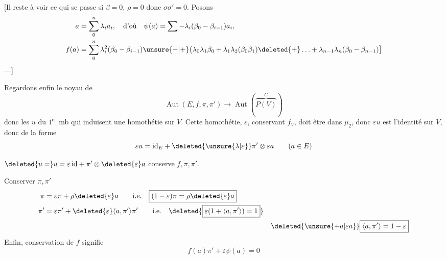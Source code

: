 
[Il reste à voir ce qui se passe si $\beta=0$, $\rho=0$ donc $\sigma\sigma'=0$. Posons
\[
\begin{aligned}
a&=\sum_0^n\lambda_i a_i,\quad\text{d'où}\quad \psi(a)=\sum-\lambda_i(\beta_0-\beta_{i-1})a_i,\\
f(a)&=\sum_0^n\lambda_i^2(\beta_0-\beta_{i-1})\unsure{-|+}\bigl(\lambda_0\lambda_1\beta_0+\lambda_1\lambda_2(\beta_0\beta_1)\deleted{+}\ldots+\lambda_{n-1}\lambda_n(\beta_0-\beta_{n-1})\bigr]
\end{aligned}
\]
\mbox{---}\qquad ]

Regardons enfin le noyau de
\[
\operatorname{Aut}(E,f,\pi,\pi')\longrightarrow\operatorname{Aut}(\overbrace{P(V)}^{C})
\]
donc les $u$ du $1^{\mathrm{er}}$ mb qui induisent une homothétie sur $V$. Cette homothétie, $\varepsilon$, conservant $f_V$, doit être dans $\mu_2$, donc $\varepsilon u$  est l'identité sur $V$, donc de la forme
\[
\varepsilon u=\mathrm{id}_E+\deleted{\unsure{\lambda|\varepsilon}}\pi'\otimes\varepsilon a\qquad(a\in E)
\]

$\deleted{u=}u=\varepsilon\,\mathrm{id}+\pi'\otimes\deleted{\varepsilon}a$ conserve $f,\pi,\pi'$.

Conserver $\pi,\pi'$
\[
\begin{aligned}
\pi&=\varepsilon\pi+\rho\deleted{\varepsilon}a\qquad\text{i.e.}\quad\boxed{(1-\varepsilon)\pi=\rho\deleted{\varepsilon}a}\\
\pi'&=\varepsilon\pi'+\deleted{\varepsilon}\langle a,\pi'\rangle\pi'\qquad\text{i.e.}\quad\deleted{\boxed{\varepsilon(1+\langle a,\pi'\rangle)=1}}\\
&&\deleted{\unsure{+a|\varepsilon a}}\boxed{\langle a,\pi'\rangle=1-\varepsilon}
\end{aligned}
\]
Enfin, conservation de $f$  signifie
\[
\boxed{f(a)\pi'+\varepsilon\psi(a)=0}
\]


